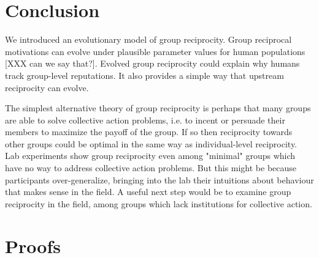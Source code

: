 \documentclass[12pt,a4paper]{article}
\begin{document}
\section{Conclusion}

We introduced an evolutionary model of group reciprocity. Group reciprocal 
motivations can evolve under plausible parameter values for human populations 
[XXX can we say that?]. Evolved group reciprocity could explain why humans
track group-level reputations. It also provides a simple way that upstream
reciprocity can evolve. 

The simplest alternative theory of group reciprocity is perhaps that many groups
are able to solve collective action problems, i.e. to incent or persuade
their members to maximize the payoff of the group. If so then reciprocity 
towards other groups could be optimal in the same way as individual-level
reciprocity. Lab experiments show group reciprocity even among "minimal" groups 
which have no way to address collective action problems. But this might be
because participants over-generalize, bringing into the lab their intuitions 
about behaviour that makes sense in the field. A useful next step would be to
examine group reciprocity in the field, among groups which lack institutions
for collective action.

\printbibliography


\newpage
\appendix
\renewcommand*\thetable{\Alph{section}.\arabic{table}}
\renewcommand*\thefigure{\Alph{section}.\arabic{figure}}
\setcounter{figure}{0}
\setcounter{table}{0}
\setcounter{equation}{0}
\section{Proofs}
\label{sec:proofs}
\end{document}
